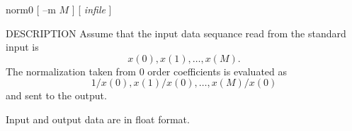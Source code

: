 % 
% 
% 
% 
%                                                                        
%

\begin{synopsis}
\item[norm0] [ --m $M$ ] [ {\em infile} ]
\end{synopsis}

\begin{qsection}{DESCRIPTION}
Assume that the input data sequance read from the standard input
is
\begin{displaymath}
x(0), x(1), \ldots, x(M).
\end{displaymath}
The normalization taken from 0 order coefficients is evaluated as
\begin{displaymath}
1/x(0), x(1)/x(0), \ldots, x(M)/x(0)
\end{displaymath}
and sent to the output.
\par
Input and output data are in float format.
\end{qsection}

